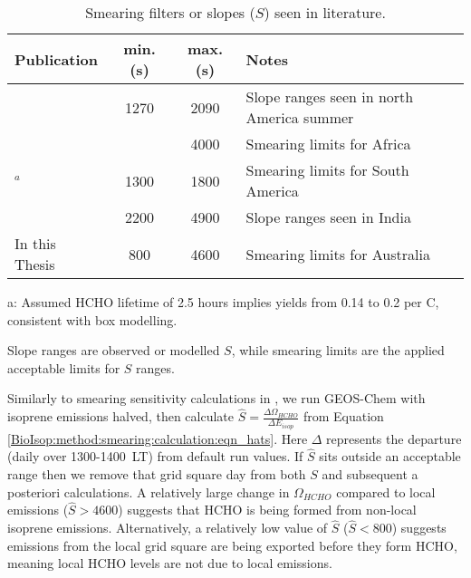       \begin{table}\begin{threeparttable}
          \caption{Smearing filters or slopes ($S$) seen in literature.}
          \begin{tabular}{ l | c  c  >{\centering\arraybackslash}p{5cm} } 
            \toprule
            Publication & min. (s) & max. (s) & Notes \\
            \midrule
            \textcite{Palmer2003}      & 1270 & 2090 & Slope ranges seen in north America summer \\
            \textcite{Marais2012}      &      & 4000 & Smearing limits for Africa \\
            \textcite{Barkley2013}$^a$ & 1300 & 1800 & Smearing limits for South America \\
            \textcite{Surl2018}        & 2200 & 4900 & Slope ranges seen in India \\
            In this Thesis             & 800  & 4600 & Smearing limits for Australia \\
            
            \bottomrule
          \end{tabular}
          \begin{tablenotes} 
            \item a: Assumed HCHO lifetime of 2.5 hours implies yields from 0.14 to 0.2 per C, consistent with box modelling.
            \item Slope ranges are observed or modelled $S$, while smearing limits are the applied acceptable limits for $S$ ranges. 
          \end{tablenotes}
          \label{BioIsop:method:smearing:tab_smearing_ranges}
        \end{threeparttable}\end{table}
      
      
      Similarly to smearing sensitivity calculations in \textcite{Marais2012}, we run GEOS-Chem with isoprene emissions halved, then calculate $\hat{S} = \frac{\Delta \Omega_{HCHO}}{\Delta E_{isop}} $ from Equation \ref{BioIsop:method:smearing:calculation:eqn_hats}.
      Here $\Delta$ represents the departure (daily over 1300-1400~LT) from default run values.
      If $\hat{S}$ sits outside an acceptable range then we remove that grid square day from both $S$ and subsequent a posteriori calculations.
      A relatively large change in $\Omega_{HCHO}$ compared to local emissions ($\hat{S}>4600$) suggests that HCHO is being formed from non-local isoprene emissions.
      Alternatively, a relatively low value of $\hat{S}$ ($\hat{S}<800$) suggests emissions from the local grid square are being exported before they form HCHO, meaning local HCHO levels are not due to local emissions.
      
